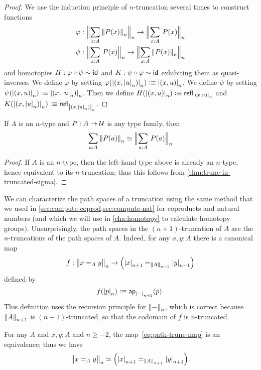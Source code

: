 \begin{proof}
We use the induction principle of $n$-truncation several times to construct
functions
\begin{align*}
\varphi & : \Trunc n{\sm{x:A}\trunc n{P(x)}}\to\Trunc n{\sm{x:A}P(x)}\\
\psi & : \Trunc n{\sm{x:A}P(x)}\to \Trunc n{\sm{x:A} \trunc n{P(x)}}
\end{align*}
and homotopies $H:\varphi\circ\psi\htpy \idfunc$ and $K:\psi\circ\varphi\htpy
\idfunc$ exhibiting them as quasi-inverses.
We define $\varphi$ by setting $\varphi(\tproj n{\pairr{x,\tproj nu}})\defeq\tproj n{\pairr{x,u}}$.
We define $\psi$ by setting $\psi(\tproj n{\pairr{x,u}})\defeq\tproj n{\pairr{x,\tproj nu}}$.
Then we define $H(\tproj n{\pairr{x,u}})\defeq \refl{\tproj n{\pairr{x,u}}}$ and
$K(\tproj n{\pairr{x,\tproj nu}})\defeq \refl{\tproj n{\pairr{x,\tproj nu}}}$.
\end{proof}

\begin{cor}\label{thm:refl-over-ntype-base}
  If $A$ is an $n$-type and $P:A\to\type$ is any type family, then
  \[ \eqv{\sm{a:A} \trunc n{P(a)}}{\Trunc n{\sm{a:A}P(a)}} \]
\end{cor}
\begin{proof}
  If $A$ is an $n$-type, then the left-hand type above is already an $n$-type, hence equivalent to its $n$-truncation; thus this follows from \autoref{thm:trunc-in-truncated-sigma}.
\end{proof}

We can characterize the path spaces of a truncation using the same method that we used in \autoref{sec:compute-coprod,sec:compute-nat} for
coproducts and natural numbers (and which we will use in \autoref{cha:homotopy} to calculate homotopy groups).
Unsurprisingly, the path spaces in the $(n+1)$-truncation of $A$ are the $n$-truncations of the path spaces of $A$.
Indeed, for any $x,y:A$ there is a canonical map
\begin{equation}
  f:\ttrunc n{x=_Ay}\to \Big(\tproj {n+1}x=_{\trunc{n+1}A}\tproj {n+1}y\Big)\label{eq:path-trunc-map}
\end{equation}
defined by
\[f(\tproj n{p})\defeq \apfunc{\tproj {n+1}-}(p). \]
This definition uses the recursion principle for $\trunc n-$, which is correct because $\trunc {n+1}A$ is $(n+1)$-truncated, so that the
codomain of $f$ is $n$-truncated.

\begin{thm} \label{thm:path-truncation}
  For any $A$ and $x,y:A$ and $n\ge -2$, the map~\eqref{eq:path-trunc-map} is an equivalence; thus we have
  \[ \eqv{\ttrunc n{x=_Ay}}{\Big(\tproj {n+1}x=_{\trunc{n+1}A}\tproj {n+1}y\Big)}. \]
\end{thm}

